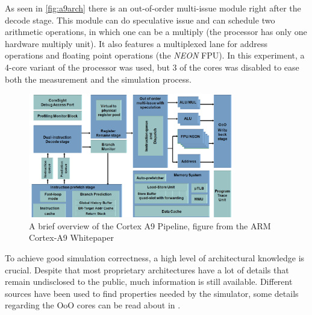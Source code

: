 As seen in \autoref{fig:a9arch} there is an out-of-order multi-issue module
right after the decode stage. This module can do speculative issue and can
schedule two arithmetic operations, in which one can be a multiply (the
processor has only one hardware multiply unit). It also features a multiplexed
lane for address operations and floating point operations (the \emph{NEON} FPU).
In this experiment, a 4-core variant of the processor was used, but 3 of the
cores was disabled to ease both the measurement and the simulation process.

\begin{figure}[bht]
    \centering
    \includegraphics[width=0.8\textwidth]{figs/A9-Pipeline-hres.jpg}
    \caption{A brief overview of the Cortex A9 Pipeline, figure from the ARM Cortex-A9 Whitepaper \cite{a9whitepaper}}
    \label{fig:a9arch}
\end{figure}

To achieve good simulation correctness, a high level of architectural knowledge
is crucial. Despite that most proprietary architectures have a lot of details
that remain undisclosed to the public, much information is still available.
Different sources have been used to find properties needed by the simulator,
some details regarding the OoO cores can be read about in
\cite{blem2013detailed}.
